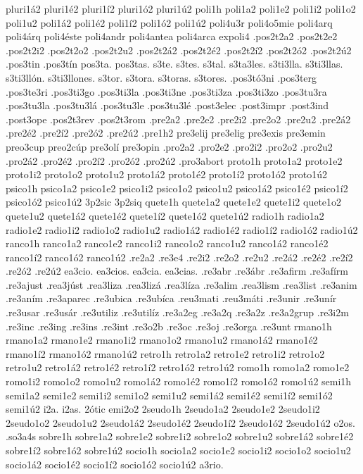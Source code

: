 {pluri1á2 pluri1é2 pluri1í2 pluri1ó2 pluri1ú2
poli1h
poli1a2 poli1e2 poli1i2 poli1o2 poli1u2
poli1á2 poli1é2 poli1í2 poli1ó2 poli1ú2
poli4u3r
poli4o5mie
poli4arq
poli4árq
poli4éste
poli4andr
poli4antea
poli4arca
expoli4
.pos2t2a2 .pos2t2e2 .pos2t2i2 .pos2t2o2 .pos2t2u2
.pos2t2á2 .pos2t2é2 .pos2t2í2 .pos2t2ó2 .pos2t2ú2
.pos3tin
.pos3tín
pos3ta.
pos3tas.
s3te.
s3tes.
s3tal.
s3ta3les.
s3ti3lla.
s3ti3llas.
s3ti3llón.
s3ti3llones.
s3tor.
s3tora.
s3toras.
s3tores.
.pos3tó3ni
.pos3terg
.pos3te3ri
.pos3ti3go
.pos3ti3la
.pos3ti3ne
.pos3ti3za
.pos3ti3zo
.pos3tu3ra
.pos3tu3la
.pos3tu3lá
.pos3tu3le
.pos3tu3lé
.post3elec
.post3impr
.post3ind
.post3ope
.pos2t3rev
.pos2t3rom
.pre2a2
.pre2e2
.pre2i2
.pre2o2
.pre2u2
.pre2á2
.pre2é2
.pre2í2
.pre2ó2
.pre2ú2
.pre1h2
pre3elij
pre3elig
pre3exis
pre3emin
preo3cup
preo2cúp
pre3olí
pre3opin
.pro2a2 .pro2e2 .pro2i2 .pro2o2 .pro2u2
.pro2á2 .pro2é2 .pro2í2 .pro2ó2 .pro2ú2
.pro3abort
proto1h
proto1a2 proto1e2 proto1i2 proto1o2 proto1u2
proto1á2 proto1é2 proto1í2 proto1ó2 proto1ú2
psico1h
psico1a2 psico1e2 psico1i2 psico1o2 psico1u2
psico1á2 psico1é2 psico1í2 psico1ó2 psico1ú2
3p2sic
3p2siq
quete1h
quete1a2 quete1e2 quete1i2 quete1o2 quete1u2
quete1á2 quete1é2 quete1í2 quete1ó2 quete1ú2
radio1h
radio1a2 radio1e2 radio1i2 radio1o2 radio1u2
radio1á2 radio1é2 radio1í2 radio1ó2 radio1ú2
ranco1h
ranco1a2 ranco1e2 ranco1i2 ranco1o2 ranco1u2
ranco1á2 ranco1é2 ranco1í2 ranco1ó2 ranco1ú2
.re2a2
.re3e4
.re2i2
.re2o2
.re2u2
.re2á2
.re2é2
.re2í2
.re2ó2
.re2ú2
ea3cio.
ea3cios.
ea3cia.
ea3cias.
.re3abr
.re3ábr
.re3afirm
.re3afírm
.re3ajust
.rea3júst
.rea3liza
.rea3lizá
.rea3líza
.re3alim
.rea3lism
.rea3list
.re3anim
.re3aním
.re3aparec
.re3ubica
.re3ubíca
.reu3mati
.reu3máti
.re3unir
.re3unír
.re3usar
.re3usár
.re3utiliz
.re3utilíz
.re3a2eg
.re3a2q
.re3a2z
.re3a2grup
.re3i2m
.re3inc
.re3ing
.re3ins
.re3int
.re3o2b
.re3oc
.re3oj
.re3orga
.re3unt
rmano1h
rmano1a2 rmano1e2 rmano1i2 rmano1o2 rmano1u2
rmano1á2 rmano1é2 rmano1í2 rmano1ó2 rmano1ú2
retro1h
retro1a2 retro1e2 retro1i2 retro1o2 retro1u2
retro1á2 retro1é2 retro1í2 retro1ó2 retro1ú2
romo1h
romo1a2 romo1e2 romo1i2 romo1o2 romo1u2
romo1á2 romo1é2 romo1í2 romo1ó2 romo1ú2
semi1h
semi1a2 semi1e2 semi1i2 semi1o2 semi1u2
semi1á2 semi1é2 semi1í2 semi1ó2 semi1ú2
i2a.
i2as.
2ótic
emi2o2
2seudo1h
2seudo1a2 2seudo1e2 2seudo1i2 2seudo1o2 2seudo1u2
2seudo1á2 2seudo1é2 2seudo1í2 2seudo1ó2 2seudo1ú2
o2os.
.so3a4s
sobre1h
sobre1a2 sobre1e2 sobre1i2 sobre1o2 sobre1u2
sobre1á2 sobre1é2 sobre1í2 sobre1ó2 sobre1ú2
socio1h
socio1a2 socio1e2 socio1i2 socio1o2 socio1u2
socio1á2 socio1é2 socio1í2 socio1ó2 socio1ú2
a3rio.
}
